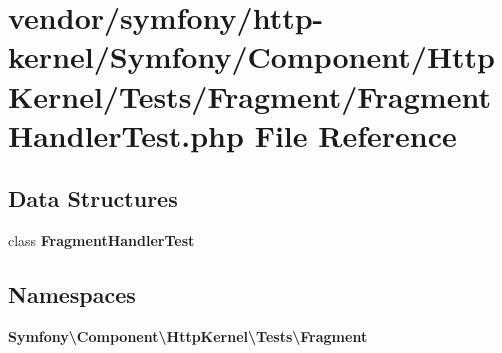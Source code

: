 \section{vendor/symfony/http-\/kernel/\+Symfony/\+Component/\+Http\+Kernel/\+Tests/\+Fragment/\+Fragment\+Handler\+Test.php File Reference}
\label{_fragment_handler_test_8php}
\subsection*{Data Structures}
\begin{DoxyCompactItemize}
\item 
class {\bf Fragment\+Handler\+Test}
\end{DoxyCompactItemize}
\subsection*{Namespaces}
\begin{DoxyCompactItemize}
\item 
 {\bf Symfony\textbackslash{}\+Component\textbackslash{}\+Http\+Kernel\textbackslash{}\+Tests\textbackslash{}\+Fragment}
\end{DoxyCompactItemize}
